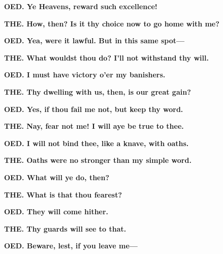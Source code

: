 \documentclass[11pt,letter]{book}
\begin{document}
\par \textbf{OED. Ye Heavens, reward such excellence!}
\par 

\par \textbf{THE. How, then? Is it thy choice now to go home with me?}
\par 

\par \textbf{OED. Yea, were it lawful. But in this same spot—}
\par 

\par \textbf{THE. What wouldst thou do? I’ll not withstand thy will.}
\par 

\par \textbf{OED. I must have victory o’er my banishers.}
\par 

\par \textbf{THE. Thy dwelling with us, then, is our great gain?}
\par 

\par \textbf{OED. Yes, if thou fail me not, but keep thy word.}
\par 

\par \textbf{THE. Nay, fear not me! I will aye be true to thee.}
\par 

\par \textbf{OED. I will not bind thee, like a knave, with oaths.}
\par 

\par \textbf{THE. Oaths were no stronger than my simple word.}
\par 

\par \textbf{OED. What will ye do, then?}
\par 

\par \textbf{THE. What is that thou fearest?}
\par 

\par \textbf{OED. They will come hither.}
\par 

\par \textbf{THE. Thy guards will see to that.}
\par 

\par \textbf{OED. Beware, lest, if you leave me—}
\par 
\end{document}
